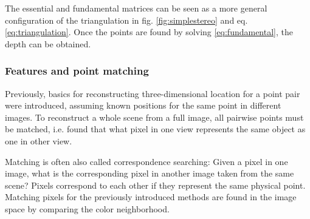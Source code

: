 
%


The essential and fundamental matrices can be seen as a more general configuration of the triangulation in fig. \ref{fig:simplestereo} and eq. \ref{eq:triangulation}.
Once the points are found by solving \ref{eq:fundamental}, the depth can be obtained.



\subsubsection{Features and point matching} %


Previously, basics for reconstructing three-dimensional location for a point pair were introduced, assuming known positions for the same point in different images.
To reconstruct a whole scene from a full image, all pairwise points must be matched, i.e. found that what pixel in one view represents the same object as one in other view.

Matching is often also called correspondence searching:
Given a pixel in one image, what is the corresponding pixel in another image taken from the same scene?
Pixels correspond to each other if they represent the same physical point.
Matching pixels for the previously introduced methods are found in the image space by comparing the color neighborhood.


